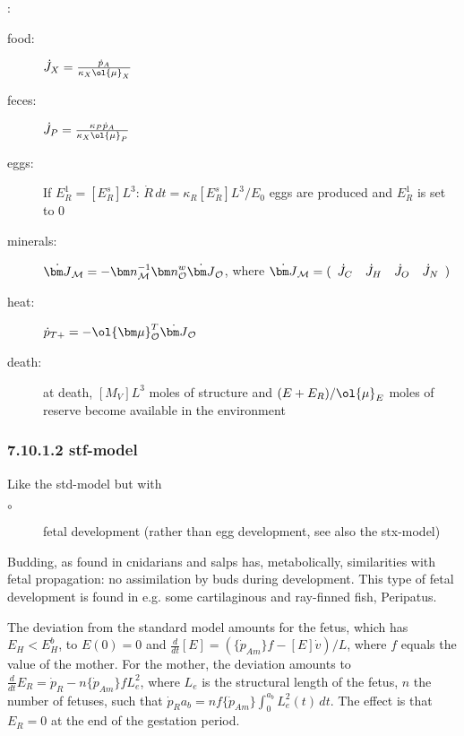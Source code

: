 \vspace{5mm}: {\small
\begin{description}
  \item[food: ] $\dot{J}_X = \frac{\dot{p}_A} {\kappa_X \ol{\mu}_X}$ 
		
  \item[feces: ] $\dot{J}_P = \frac{\kappa_P \dot{p}_A} {\kappa_X \ol{\mu}_P}$
		
  \item[eggs: ] If $E_R^1 = [E_R^s] L^3$: $\dot{R}\,dt = \kappa_R [E_R^s] L^3/ E_0$ eggs are produced and $E_R^1$ is set to $0$ 
		
  \item[minerals: ] $\dot{\bm J}_{\cal M} = - {\bm n}_{\cal M}^{-1} {\bm n}_{\cal O}^w \dot{\bm J}_{\cal O}$, where 
		$\dot{\bm J}_{\cal M} = (\begin{array}{cccc} \dot{J}_C  & \dot{J}_H & \dot{J}_O  & \dot{J}_N \end{array})$
			
	\item[heat: ] $\dot{p}_{T+} = - \ol{\bm \mu}_{\cal O}^T \dot{\bm J}_{\cal O}$
		
	\item[death: ] at death, $[M_V] L^3$ moles of structure and $(E + E_R)/ \ol{\mu}_E$ moles of reserve become available in the environment
\end{description}}


\subsubsection*{7.10.1.2 stf-model}
{}
\label{sec_c:stf}

Like the std-model but with
\begin{description}
  \item[$\circ$] fetal development (rather than egg development, see also the stx-model)
\end{description}
Budding, as found in cnidarians and salps has, metabolically, similarities with fetal propagation: 
  no assimilation by buds during development.
This type of fetal development is found in e.g. some cartilaginous and ray-finned fish, Peripatus.

The deviation from the standard model amounts for the fetus, which has $E_H < E_H^b$, to 
  $E(0) = 0$ and $\frac{d} {dt} [E] = (\{\dot{p}_{Am}\} f - [E] \dot{v})/ L$, where $f$ equals the value of the mother.
For the mother, the deviation amounts to $\frac{d} {dt} E_R = \dot{p}_R - n \{\dot{p}_{Am}\} f L_e^2$, where $L_e$ is the structural length of the fetus, $n$ the number of fetuses, such that $\dot{p}_R a_b = n f \{\dot{p}_{Am}\} \int_0^{a_b} L_e^2(t) \, dt$.
The effect is that $E_R = 0$ at the end of the gestation period.
 
